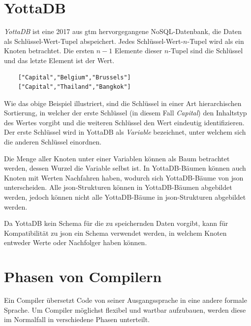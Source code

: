 \documentclass[oneside]{ausarbeitung}
\begin{document}
	
	
	
\section{YottaDB}
	
\textit{YottaDB} ist eine 2017 aus \ac{gtm} hervorgegangene NoSQL-Datenbank, die Daten als Schlüssel-Wert-Tupel abspeichert. Jedes Schlüssel-Wert-$n$-Tupel wird als ein Knoten betrachtet. Die ersten $n-1$ Elemente dieser $n$-Tupel sind die Schlüssel und das letzte Element ist der Wert. 
	
\begin{lstlisting}
	["Capital","Belgium","Brussels"]
	["Capital","Thailand","Bangkok"]
\end{lstlisting}
	
Wie das obige Beispiel illustriert, sind die Schlüssel in einer Art hierarchischen Sortierung, in welcher der erste Schlüssel (in diesem Fall \textit{Capital}) den Inhaltstyp des Wertes vorgibt und die weiteren Schlüssel den Wert eindeutig identifizieren. Der erste Schlüssel wird in YottaDB als \textit{Variable} bezeichnet, unter welchem sich die anderen Schlüssel einordnen.
	
Die Menge aller Knoten unter einer Variablen können als Baum betrachtet werden, dessen Wurzel die Variable selbst ist. In YottaDB-Bäumen können auch Knoten mit Werten Nachfahren haben, wodurch sich YottaDB-Bäume von \ac{json} unterscheiden. Alle \ac{json}-Strukturen können in YottaDB-Bäumen abgebildet werden, jedoch können nicht alle YottaDB-Bäume in \ac{json}-Strukturen abgebildet werden.
	
Da YottaDB kein Schema für die zu speichernden Daten vorgibt, kann für Kompatibilität zu \ac{json} ein Schema verwendet werden, in welchem Knoten entweder Werte oder Nachfolger haben können.
	
	
	
	
\section{Phasen von Compilern}

Ein Compiler übersetzt Code von seiner Ausgangssprache in eine andere formale Sprache. Um Compiler möglichst flexibel und wartbar aufzubauen, werden diese im Normalfall in verschiedene Phasen unterteilt.
	
\end{document}
